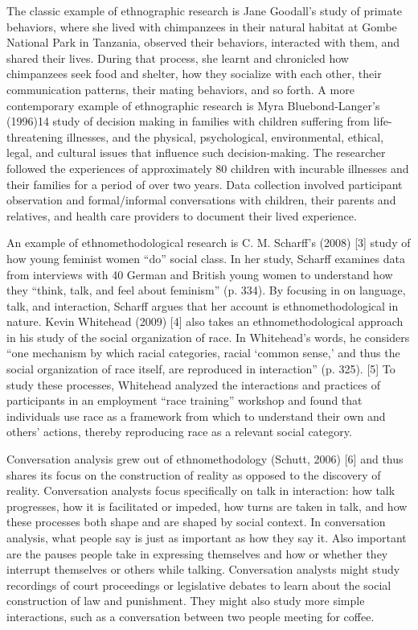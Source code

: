 The classic example of ethnographic research is Jane Goodall’s study of primate behaviors, where she lived with chimpanzees in their natural habitat at Gombe National Park in Tanzania, observed their behaviors, interacted with them, and shared their lives. During that process, she learnt and chronicled how chimpanzees seek food and shelter, how they socialize with each other, their communication patterns, their mating behaviors, and so forth. A more contemporary example of ethnographic research is Myra Bluebond-Langer’s (1996)14 study of decision making in families with children suffering from life-threatening illnesses, and the physical, psychological, environmental, ethical, legal, and cultural issues that influence such decision-making. The researcher followed the experiences of approximately 80 children with incurable illnesses and their families for a period of over two years. Data collection involved participant observation and formal/informal conversations with children, their parents and relatives, and health care providers to document their lived experience.

An example of ethnomethodological research is C. M. Scharff’s (2008) [3] study of how young feminist women “do” social class. In her study, Scharff examines data from interviews with 40 German and British young women to understand how they “think, talk, and feel about feminism” (p. 334). By focusing in on language, talk, and interaction, Scharff argues that her account is ethnomethodological in nature. Kevin Whitehead (2009) [4] also takes an ethnomethodological approach in his study of the social organization of race. In Whitehead’s words, he considers “one mechanism by which racial categories, racial ‘common sense,’ and thus the social organization of race itself, are reproduced in interaction” (p. 325). [5] To study these processes, Whitehead analyzed the interactions and practices of participants in an employment “race training” workshop and found that individuals use race as a framework from which to understand their own and others’ actions, thereby reproducing race as a relevant social category.

Conversation analysis grew out of ethnomethodology (Schutt, 2006) [6] and thus shares its focus on the construction of reality as opposed to the discovery of reality. Conversation analysts focus specifically on talk in interaction: how talk progresses, how it is facilitated or impeded, how turns are taken in talk, and how these processes both shape and are shaped by social context. In conversation analysis, what people say is just as important as how they say it. Also important are the pauses people take in expressing themselves and how or whether they interrupt themselves or others while talking. Conversation analysts might study recordings of court proceedings or legislative debates to learn about the social construction of law and punishment. They might also study more simple interactions, such as a conversation between two people meeting for coffee.

